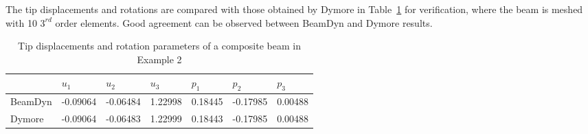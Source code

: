 The tip displacements and rotations are compared with those obtained by Dymore in Table~\ref{E2Tip} for verification, where the beam is meshed with 10 $3^{rd}$ order elements. Good agreement can be observed between BeamDyn and Dymore results.
\begin{table}[tbp]
\centering 
\caption{Tip displacements and rotation parameters of a composite beam in Example 2}
\label{E2Tip} 
	\begin{tabular}{| l | l | l | l | l | l | l |}
    	\hline
    	 & $u_1$ & $u_2$ & $u_3$  & $p_1$ & $p_2$ & $p_3$  \\ 
	 \hline
	 BeamDyn & -0.09064 & -0.06484 & 1.22998 & 0.18445 & -0.17985 & 0.00488 \\
	 \hline
	 Dymore & -0.09064 & -0.06483 & 1.22999 & 0.18443 & -0.17985 & 0.00488 \\
    	\hline
    \end{tabular}
\end{table}

